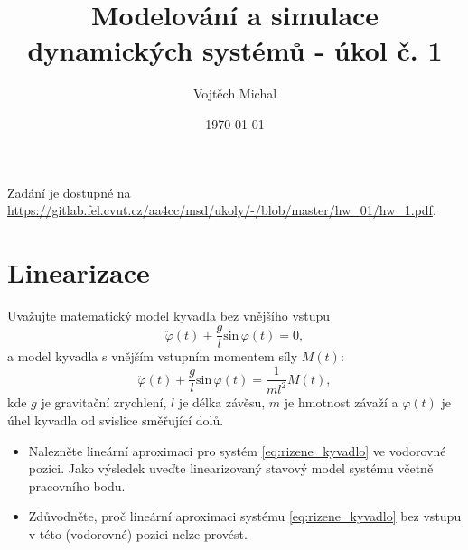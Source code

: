 \documentclass[twoside]{article}
\title{Modelování a simulace dynamických systémů - úkol č. 1}
\author{Vojtěch Michal}
\date{\today}
\begin{document}
\maketitle

Zadání je dostupné na \url{https://gitlab.fel.cvut.cz/aa4cc/msd/ukoly/-/blob/master/hw_01/hw_1.pdf}.
\section{Linearizace}

Uvažujte matematický model kyvadla bez vnějšího vstupu
\begin{equation}
	\ddot{\varphi}(t) + \frac{g}{l} \text{sin}\,\varphi(t) = 0,
	\label{eq:nerizene_kyvadlo}
\end{equation}
a model kyvadla s vnějším vstupním momentem síly $M(t)$:
\begin{equation}
	\ddot{\varphi}(t) + \frac{g}{l} \text{sin}\,\varphi(t) = \frac{1}{ml^2} M(t),
	\label{eq:rizene_kyvadlo}
\end{equation}
kde $g$ je gravitační zrychlení, $l$ je délka závěsu, $m$ je hmotnost závaží a $\varphi(t)$ je úhel kyvadla od svislice směřující dolů.
\begin{itemize}
	\item Nalezněte lineární aproximaci pro systém \eqref{eq:rizene_kyvadlo} ve vodorovné pozici. Jako výsledek uveďte linearizovaný stavový
	model systému včetně pracovního bodu.
	\item Zdůvodněte, proč lineární aproximaci systému \eqref{eq:rizene_kyvadlo} bez vstupu v této (vodorovné) pozici nelze provést.
\end{itemize}
\end{document}
